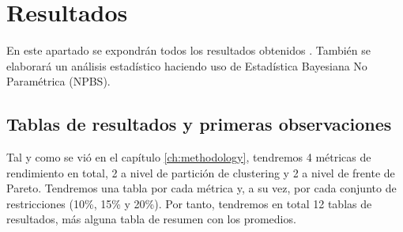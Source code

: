 \chapter{Resultados}\label{ch:results}

En este apartado se expondrán todos los resultados obtenidos . También se elaborará un análisis estadístico haciendo uso de Estadística Bayesiana No Paramétrica (NPBS).

\section{Tablas de resultados y primeras observaciones}

Tal y como se vió en el capítulo \ref{ch:methodology}, tendremos 4 métricas de rendimiento en total, 2 a nivel de partición de clustering y 2 a nivel de frente de Pareto. Tendremos una tabla por cada métrica y, a su vez, por cada conjunto de restricciones (10\%, 15\% y 20\%). Por tanto, tendremos en total 12 tablas de resultados, más alguna tabla de resumen con los promedios.

